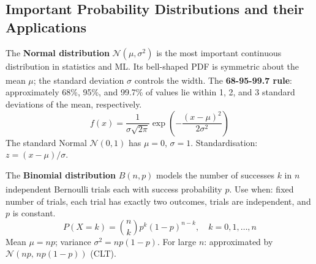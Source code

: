     \subsection{Important Probability Distributions and their Applications}
    \begin{tcbitemize}[ skin=sectionraster ]

        \tcbitem[title={Normal (Gaussian) Distribution}, raster multicolumn=6]
        The \textbf{Normal distribution} $\mathcal{N}(\mu, \sigma^2)$ is the most important continuous distribution in statistics and ML. Its bell-shaped PDF is symmetric about the mean $\mu$; the standard deviation $\sigma$ controls the width\textsuperscript{\cite{brucePracticalStatisticsData2017}}. The \textbf{68-95-99.7 rule}: approximately 68\%, 95\%, and 99.7\% of values lie within 1, 2, and 3 standard deviations of the mean, respectively.
        \tcblower
        \begin{equation}
            f(x) = \frac{1}{\sigma\sqrt{2\pi}}\exp\!\left(-\frac{(x-\mu)^2}{2\sigma^2}\right)
        \end{equation}
        The standard Normal $\mathcal{N}(0,1)$ has $\mu=0$, $\sigma=1$. Standardisation: $z = (x - \mu)/\sigma$.

        \tcbitem[title={Binomial Distribution}, raster multicolumn=6]
        The \textbf{Binomial distribution} $B(n, p)$ models the number of successes $k$ in $n$ independent Bernoulli trials each with success probability $p$\textsuperscript{\cite{downeyThinkBayes2016}}. Use when: fixed number of trials, each trial has exactly two outcomes, trials are independent, and $p$ is constant.
        \tcblower
        \begin{equation}
            P(X = k) = \binom{n}{k} p^k (1-p)^{n-k}, \quad k = 0, 1, \ldots, n
        \end{equation}
        Mean $\mu = np$; variance $\sigma^2 = np(1-p)$. For large $n$: approximated by $\mathcal{N}(np,\, np(1-p))$ (CLT).

    \end{tcbitemize}

